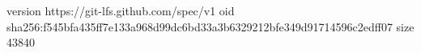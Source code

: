 version https://git-lfs.github.com/spec/v1
oid sha256:f545bfa435ff7e133a968d99dc6bd33a3b6329212bfe349d91714596c2edff07
size 43840
